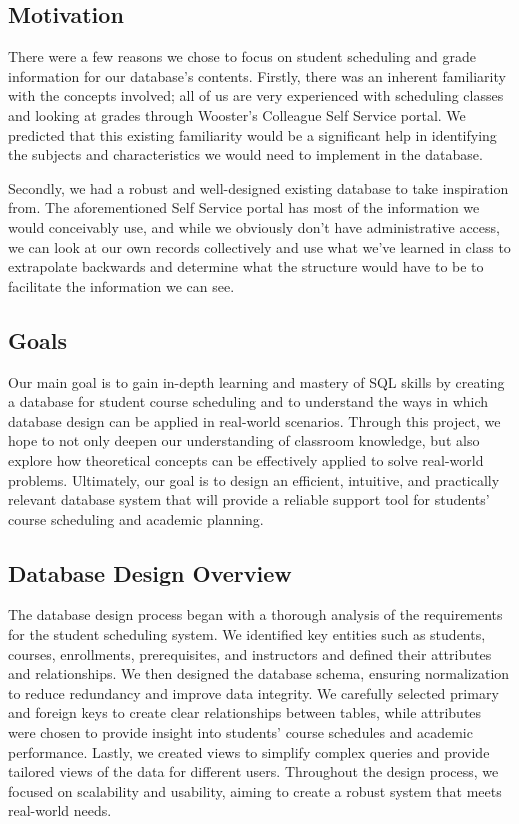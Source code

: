 \documentclass[12pt]{article}
\begin{document}
\subsection{Motivation}
There were a few reasons we chose to focus on student scheduling and grade information for our database’s contents. Firstly, there was an inherent familiarity with the concepts involved; all of us are very experienced with scheduling classes and looking at grades through Wooster’s Colleague Self Service portal. We predicted that this existing familiarity would be a significant help in identifying the subjects and characteristics we would need to implement in the database.

Secondly, we had a robust and well-designed existing database to take inspiration from. The aforementioned Self Service portal has most of the information we would conceivably use, and while we obviously don’t have administrative access, we can look at our own records collectively and use what we’ve learned in class to extrapolate backwards and determine what the structure would have to be to facilitate the information we can see.

\subsection{Goals}
Our main goal is to gain in-depth learning and mastery of SQL skills by creating a database for student course scheduling and to understand the ways in which database design can be applied in real-world scenarios. Through this project, we hope to not only deepen our understanding of classroom knowledge, but also explore how theoretical concepts can be effectively applied to solve real-world problems. Ultimately, our goal is to design an efficient, intuitive, and practically relevant database system that will provide a reliable support tool for students' course scheduling and academic planning.

\subsection{Database Design Overview}
The database design process began with a thorough analysis of the requirements for the student scheduling system. We identified key entities such as students, courses, enrollments, prerequisites, and instructors and defined their attributes and relationships. We then designed the database schema, ensuring normalization to reduce redundancy and improve data integrity. We carefully selected primary and foreign keys to create clear relationships between tables, while attributes were chosen to provide insight into students' course schedules and academic performance. Lastly, we created views to simplify complex queries and provide tailored views of the data for different users. Throughout the design process, we focused on scalability and usability, aiming to create a robust system that meets real-world needs.
\end{document}
